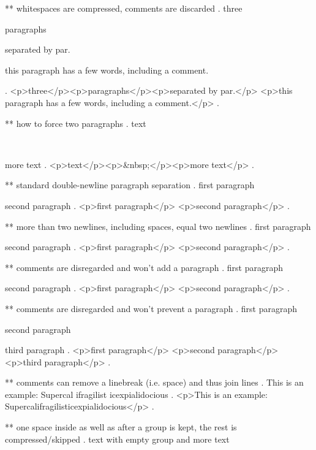 ** whitespaces are compressed, comments are discarded
.
three
\par

paragraphs
    \par\par
 separated by par.

   this     paragraph  has a    few 
 words,   including
 a comment.


 
.
<p>three</p><p>paragraphs</p><p>separated by par.</p>
<p>this paragraph has a few words, including a comment.</p>
.


** how to force two paragraphs
.
text  \par
~
\par
more text
.
<p>text</p><p>&nbsp;</p><p>more text</p>
.


** standard double-newline paragraph separation
.
first paragraph

 second paragraph
.
<p>ﬁrst paragraph</p>
<p>second paragraph</p>
.



** more than two newlines, including spaces, equal two newlines
.
first paragraph

   
  


second paragraph
.
<p>ﬁrst paragraph</p>
<p>second paragraph</p>
.


** comments are disregarded and won't add a paragraph
.
first paragraph




second paragraph
.
<p>ﬁrst paragraph</p>
<p>second paragraph</p>
.

** comments are disregarded and won't prevent a paragraph
.
first paragraph %

second paragraph%

third paragraph
.
<p>ﬁrst paragraph</p>
<p>second paragraph</p>
<p>third paragraph</p>
.


** comments can remove a linebreak (i.e. space) and thus join lines
.
This is an %
example: Supercal%
              ifragilist%
    icexpialidocious
.
<p>This is an example: Supercalifragilisticexpialidocious</p>
.



** one space inside as well as after a group is kept, the rest is compressed/skipped
.
text with empty group {  } and more text

